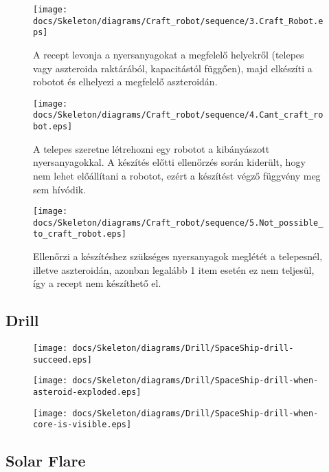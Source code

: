 \begin{figure}[H] 
    \centering 
    \texttt{[image: docs/Skeleton/diagrams/Craft\_robot/sequence/3.Craft\_Robot.eps]} 
    \caption{A recept levonja a nyersanyagokat a megfelelő helyekről (telepes vagy aszteroida raktárából, kapacitástól függően), majd elkészíti a robotot és elhelyezi a megfelelő aszteroidán.} 
\end{figure} 

\begin{figure}[H] 
    \centering 
    \texttt{[image: docs/Skeleton/diagrams/Craft\_robot/sequence/4.Cant\_craft\_robot.eps]} 
    \caption{A telepes szeretne létrehozni egy robotot a kibányászott nyersanyagokkal. A készítés előtti ellenőrzés során kiderült, hogy nem lehet előállítani a robotot, ezért a készítést végző függvény meg sem hívódik. } 
\end{figure} 

\begin{figure}[H] 
    \centering 
    \texttt{[image: docs/Skeleton/diagrams/Craft\_robot/sequence/5.Not\_possible\_to\_craft\_robot.eps]} 
    \caption{Ellenőrzi a készítéshez szükséges nyersanyagok meglétét a telepesnél, illetve aszteroidán, azonban legalább 1 item esetén ez nem teljesül, így a recept nem készíthető el. } 
\end{figure} 


\subsection{Drill}

\begin{figure}[H] 
    \centering 
    \texttt{[image: docs/Skeleton/diagrams/Drill/SpaceShip-drill-succeed.eps]} 
    \caption{} 
\end{figure} 

\begin{figure}[H] 
    \centering 
    \texttt{[image: docs/Skeleton/diagrams/Drill/SpaceShip-drill-when-asteroid-exploded.eps]} 
    \caption{} 
\end{figure} 

\begin{figure}[H] 
    \centering 
    \texttt{[image: docs/Skeleton/diagrams/Drill/SpaceShip-drill-when-core-is-visible.eps]} 
    \caption{} 
\end{figure} 

\subsection{Solar Flare}

